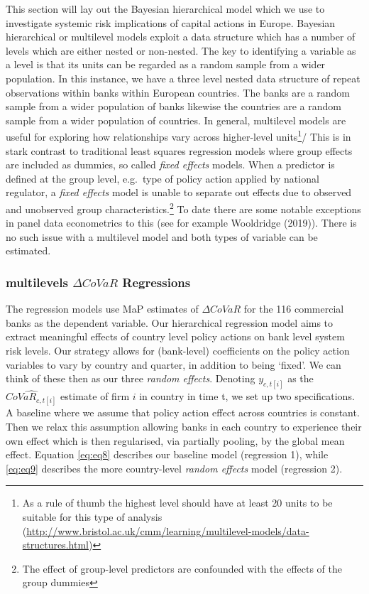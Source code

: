 \documentclass[
  10pt,
]{article}
\begin{document}
This section will lay out the Bayesian hierarchical model which we use
to investigate systemic risk implications of capital actions in Europe.
Bayesian hierarchical or multilevel models exploit a data structure
which has a number of levels which are either nested or non-nested. The
key to identifying a variable as a level is that its units can be
regarded as a random sample from a wider population. In this instance,
we have a three level nested data structure of repeat observations
within banks within European countries. The banks are a random sample
from a wider population of banks likewise the countries are a random
sample from a wider population of countries. In general, multilevel
models are useful for exploring how relationships vary across
higher-level units\footnote{As a rule of thumb the highest level should
  have at least 20 units to be suitable for this type of analysis
  (\url{http://www.bristol.ac.uk/cmm/learning/multilevel-models/data-structures.html})}/
This is in stark contrast to traditional least squares regression models
where group effects are included as dummies, so called \emph{fixed
effects} models. When a predictor is defined at the group level,
e.g.~type of policy action applied by national regulator, a \emph{fixed
effects} model is unable to separate out effects due to observed and
unobserved group characteristics.\footnote{The effect of group-level
  predictors are confounded with the effects of the group dummies} To
date there are some notable exceptions in panel data econometrics to
this (see for example Wooldridge (2019)). There is no such issue with a
multilevel model and both types of variable can be estimated.

\hypertarget{multilevels-delta-covar-regressions}{%
\subsubsection{\texorpdfstring{multilevels \(\Delta CoVaR\)
Regressions}{multilevels \textbackslash Delta CoVaR Regressions}}\label{multilevels-delta-covar-regressions}}

The regression models use MaP estimates of \(\Delta CoVaR\) for the 116
commercial banks as the dependent variable. Our hierarchical regression
model aims to extract meaningful effects of country level policy actions
on bank level system risk levels. Our strategy allows for (bank-level)
coefficients on the policy action variables to vary by country and
quarter, in addition to being `fixed'. We can think of these then as our
three \emph{random effects}. Denoting \(y_{c,t[i]}\) as the
\(\widehat{CoVaR_{c,t[i]}}\) estimate of firm \(i\) in country in time
t, we set up two specifications. A baseline where we assume that policy
action effect across countries is constant. Then we relax this
assumption allowing banks in each country to experience their own effect
which is then regularised, via partially pooling, by the global mean
effect. Equation \ref{eq:eq8} describes our baseline model (regression
1), while \ref{eq:eq9} describes the more country-level \emph{random
effects} model (regression 2).
\end{document}
